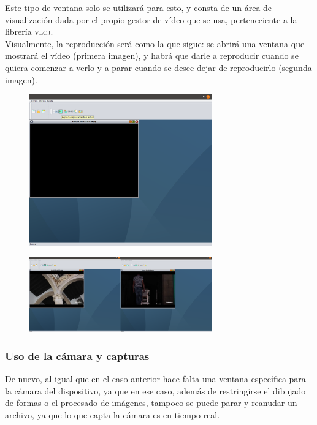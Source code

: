 \documentclass[11pt,a4paper]{article}
\begin{document}
Este tipo de ventana solo se utilizará para esto, y consta de un área de visualización dada por el propio gestor de vídeo que se usa, perteneciente a la librería \textsc{vlcj}.\\

Visualmente, la reproducción será como la que sigue: se abrirá una ventana que mostrará el vídeo (primera imagen), y habrá que darle a reproducir cuando se quiera comenzar a verlo y a parar cuando se desee dejar de reproducirlo (segunda imagen).

\begin{figure}[H]
\centering
	\includegraphics[width=0.7\textwidth]{img/initvid.png}
\end{figure}

\begin{figure}[H]
\centering
	\includegraphics[width=0.7\textwidth]{img/video.png}
\end{figure}


\subsubsection{Uso de la cámara y capturas}
De nuevo, al igual que en el caso anterior hace falta una ventana específica para la cámara del dispositivo, ya que en ese caso, además de restringirse el dibujado de formas o el procesado de imágenes, tampoco se puede parar y reanudar un archivo, ya que lo que capta la cámara es en tiempo real.\\
\end{document}
